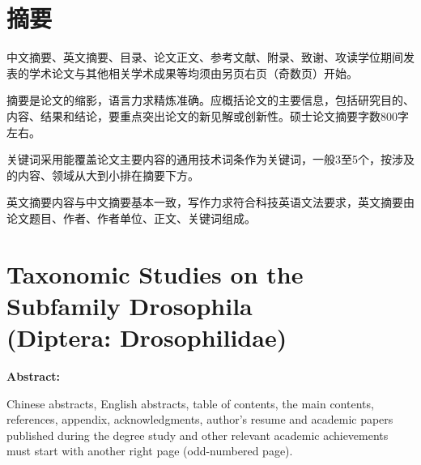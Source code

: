 \makeTitle%

\makeDeclaration%

\chapter*{摘\quad\quad 要}

中文摘要、英文摘要、目录、论文正文、参考文献、附录、致谢、攻读学位期间发表的学术论文与其他相关学术成果等均须由另页右页（奇数页）开始。

摘要是论文的缩影，语言力求精炼准确。应概括论文的主要信息，包括研究目的、内容、结果和结论，要重点突出论文的新见解或创新性。硕士论文摘要字数800字左右。

关键词采用能覆盖论文主要内容的通用技术词条作为关键词，一般3至5个，按涉及的内容、领域从大到小排在摘要下方。

英文摘要内容与中文摘要基本一致，写作力求符合科技英语文法要求，英文摘要由论文题目、作者、作者单位、正文、关键词组成。



\chapter*{Taxonomic Studies on the Subfamily Drosophila\\(Diptera: Drosophilidae)}

{
    \vspace{\baselineskip}
    \noindent\bfseries{Abstract:}
}

Chinese abstracts, English abstracts, table of contents, the main contents, references, appendix, acknowledgments, author's resume and academic papers published during the degree study and other relevant academic achievements must start with another right page (odd-numbered page).

